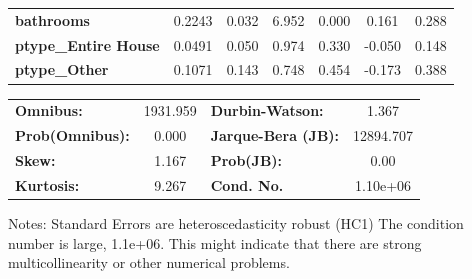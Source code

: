\begin{center}
\begin{tabular}{lcccccc}
\textbf{bathrooms}              &       0.2243  &        0.032     &     6.952  &         0.000        &        0.161    &        0.288     \\
\textbf{ptype\_Entire House}    &       0.0491  &        0.050     &     0.974  &         0.330        &       -0.050    &        0.148     \\
\textbf{ptype\_Other}           &       0.1071  &        0.143     &     0.748  &         0.454        &       -0.173    &        0.388     \\
\bottomrule
\end{tabular}
\begin{tabular}{lclc}
\textbf{Omnibus:}       & 1931.959 & \textbf{  Durbin-Watson:     } &     1.367  \\
\textbf{Prob(Omnibus):} &   0.000  & \textbf{  Jarque-Bera (JB):  } & 12894.707  \\
\textbf{Skew:}          &   1.167  & \textbf{  Prob(JB):          } &      0.00  \\
\textbf{Kurtosis:}      &   9.267  & \textbf{  Cond. No.          } &  1.10e+06  \\
\bottomrule
\end{tabular}
\end{center}

Notes: \newline
 [1] Standard Errors are heteroscedasticity robust (HC1) \newline
 [2] The condition number is large, 1.1e+06. This might indicate that there are \newline
 strong multicollinearity or other numerical problems.